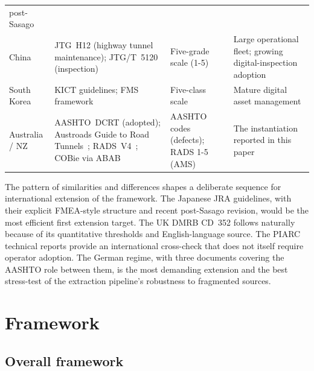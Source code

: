 \documentclass[11pt,a4paper]{article}
\begin{document}
\begin{table}[htbp]
\begin{tabularx}{\textwidth}{p{2.0cm} p{3.4cm} p{2.6cm} X}
  post-Sasago \\[2pt]
China & JTG~H12 (highway tunnel maintenance);
  JTG/T~5120 (inspection)~\citep{JTGH122015} &
  Five-grade scale (1-5) & Large operational fleet; growing
  digital-inspection adoption \\[2pt]
South Korea & KICT guidelines; FMS framework &
  Five-class scale & Mature digital asset management \\[2pt]
Australia / NZ & AASHTO~DCRT (adopted); Austroads Guide to Road
  Tunnels~\citep{Austroads2024}; RADS~V4~\citep{AustroadsRADS2022};
  COBie via ABAB~\citep{ABAB2018} &
  AASHTO codes (defects); RADS 1-5 (AMS) &
  The instantiation reported in this paper \\
\bottomrule
\end{tabularx}
\end{table}

The pattern of similarities and differences shapes a deliberate sequence for international extension of the framework. The Japanese JRA guidelines, with their explicit FMEA-style structure and recent post-Sasago revision, would be the most efficient first extension
target. The UK DMRB CD~352 follows naturally because of its quantitative thresholds and English-language source. The PIARC technical reports provide an international cross-check that does not itself require operator adoption. The German regime, with three documents covering the AASHTO role between them, is the most demanding extension and the best stress-test of the extraction pipeline's robustness to fragmented sources.


\section{Framework}
\label{sec:method}

\subsection{Overall framework}
\label{sec:arch}
\end{document}
